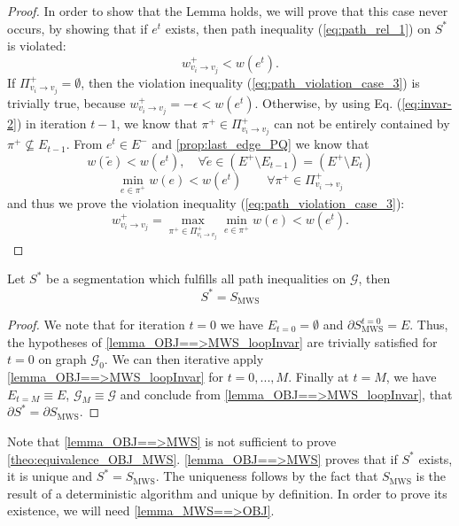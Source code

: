 \begin{proof}
In order to show that the Lemma holds, we will prove that this case never occurs, %
by showing that if $e^t$ exists, then path inequality (\ref{eq:path_rel_1}) on $S^*$ is violated:
\begin{equation}
    w_{v_{i}\rightarrow v_{j}}^{+} < w(e^{t}). \label{eq:path_violation_case_3}
\end{equation}
If $\Pi_{v_{i}\rightarrow v_{j}}^{+}=\emptyset$, then the violation inequality
(\ref{eq:path_violation_case_3}) is trivially true, because $w_{v_{i}\rightarrow v_{j}}^{+}=-\epsilon<w(e^{t})$.
Otherwise, by using Eq. (\ref{eq:invar-2}) in iteration $t-1$, we know that $\pi^{+}\in\Pi_{v_{i}\rightarrow v_{j}}^{+}$ can not be entirely contained by $\pi^{+}\nsubseteq E_{t-1}$. From $e^t \in E^{-}$ and  \autoref{prop:last_edge_PQ} we know that 
\begin{equation}w(\tilde{e})<w(e^{t}), \quad \forall\tilde{e}\in (E^{+}\setminus E_{t-1}) = (E^{+}\setminus E_{t}) \end{equation}
\begin{equation}
     \underset{e\in\pi^{+}}{\min}w(e) <w(e^{t}) \quad \quad  \forall \pi^+ \in \Pi_{v_{i}\rightarrow v_{j}}^{+}
 \end{equation} 
and thus we prove the violation inequality (\ref{eq:path_violation_case_3}):
\begin{equation}
w_{v_{i}\rightarrow v_{j}}^{+}=\max_{\pi^{+}\in\Pi_{v_{i}\rightarrow v_{j}}^{+}}\underset{e\in\pi^{+}}{\min}w(e)<w(e^{t}).
 \end{equation}
\end{proof}




\begin{lemma}
\label{lemma_OBJ==>MWS}Let $S^{*}$ be a segmentation
 which fulfills all path inequalities on $\mathcal{G}$, then
\begin{equation}
    S^{*}=S_{\mathrm{MWS}}
\end{equation}
\end{lemma}

\begin{proof}
We note that for iteration $t=0$ we have $E_{t=0}=\emptyset$ and
$\partial S_{\mathrm{MWS}}^{t=0}=E$. Thus, the hypotheses of \autoref{lemma_OBJ==>MWS_loopInvar} are trivially satisfied for $t=0$ on graph $\mathcal{G}_{0}$.
We can then iterative apply \autoref{lemma_OBJ==>MWS_loopInvar} for $t=0,...,M$. Finally at $t=M$,
we have $E_{t=M}  \equiv E$, $\mathcal{G}_{M} \equiv \mathcal{G}$ and conclude from \autoref{lemma_OBJ==>MWS_loopInvar}, that $\partial S^{*}=\partial S_{\mathrm{MWS}}$.
\end{proof}
Note that \autoref{lemma_OBJ==>MWS} is not sufficient to prove \autoref{theo:equivalence_OBJ_MWS}. \autoref{lemma_OBJ==>MWS} proves that if $S^{*}$ exists, it is unique and $S^{*}=S_{\mathrm{MWS}}$. The uniqueness follows by the fact that $S_{\mathrm{MWS}}$ is the result of a deterministic algorithm and unique by definition. In order to prove its existence, we will need \autoref{lemma_MWS==>OBJ}.


